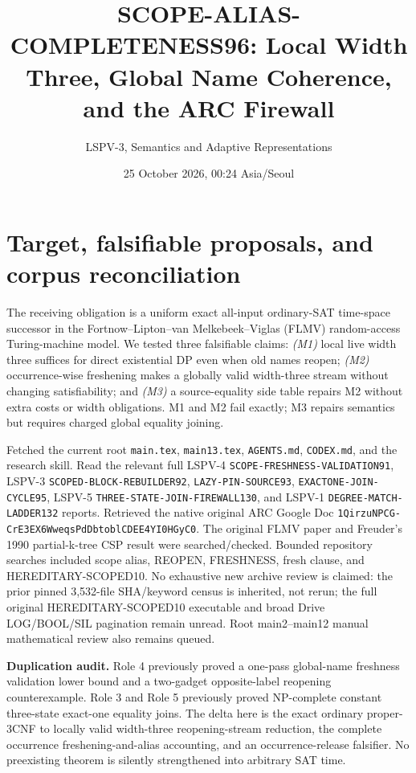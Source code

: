 \documentclass[11pt]{article}
\title{SCOPE-ALIAS-COMPLETENESS96: Local Width Three, Global Name Coherence, and the ARC Firewall}
\author{LSPV-3, Semantics and Adaptive Representations}
\date{25 October 2026, 00:24 Asia/Seoul}
\begin{document}
\maketitle
\begin{center}\end{center}

\section{Target, falsifiable proposals, and corpus reconciliation}
The receiving obligation is a uniform exact all-input ordinary-SAT
time-space successor in the Fortnow--Lipton--van Melkebeek--Viglas (FLMV)
random-access Turing-machine model. We tested three falsifiable claims:
\emph{(M1)} local live width three suffices for direct existential DP
even when old names reopen;
\emph{(M2)} occurrence-wise freshening makes a globally valid width-three
stream without changing satisfiability; and
\emph{(M3)} a source-equality side table repairs M2 without extra costs
or width obligations. M1 and M2 fail exactly; M3 repairs semantics but
requires charged global equality joining.

Fetched the current root \texttt{main.tex}, \texttt{main13.tex},
\texttt{AGENTS.md}, \texttt{CODEX.md}, and the research skill.
Read the relevant full LSPV-4 \texttt{SCOPE-FRESHNESS-VALIDATION91},
LSPV-3 \texttt{SCOPED-BLOCK-REBUILDER92},
\texttt{LAZY-PIN-SOURCE93}, \texttt{EXACTONE-JOIN-CYCLE95},
LSPV-5 \texttt{THREE-STATE-JOIN-FIREWALL130},
and LSPV-1 \texttt{DEGREE-MATCH-LADDER132} reports.
Retrieved the native original ARC Google Doc
\texttt{1QirzuNPCG-CrE3EX6WweqsPdDbtoblCDEE4YI0HGyC0}.
The original FLMV paper and Freuder's 1990 partial-k-tree CSP
result were searched/checked. Bounded repository searches included
scope alias, REOPEN, FRESHNESS, fresh clause, and
HEREDITARY-SCOPED10. No exhaustive new archive review is claimed:
the prior pinned 3,532-file SHA/keyword census is inherited, not rerun;
the full original HEREDITARY-SCOPED10 executable and broad
Drive LOG/BOOL/SIL pagination remain unread. Root main2--main12
manual mathematical review also remains queued.

\textbf{Duplication audit.} Role 4 previously proved a one-pass
global-name freshness validation lower bound and a two-gadget
opposite-label reopening counterexample. Role 3 and Role 5 previously
proved NP-complete constant three-state exact-one equality joins.
The delta here is the exact ordinary proper-3CNF to locally valid
width-three reopening-stream reduction, the complete occurrence
freshening-and-alias accounting, and an occurrence-release falsifier.
No preexisting theorem is silently strengthened into arbitrary SAT time.
\end{document}
